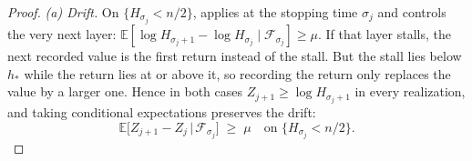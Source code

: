 \documentclass[
    aps,
    superscriptaddress,
    onecolumn,
    10pt,
    prx,
    nofootinbib
]{revtex4-2}
\theoremstyle{namedstatement}
\theoremstyle{plain}
\begin{document}
\begin{proof}
\smallskip\noindent\emph{(a) Drift.}
On $\{H_{\sigma_j}<n/2\}$,  applies at the stopping time $\sigma_j$ and controls the very next layer: $\mathbb E[\log H_{\sigma_j+1}-\log H_{\sigma_j}\mid\mathcal F_{\sigma_j}]\ge\mu$. If that layer stalls, the next recorded value is the first return instead of the stall. But the stall lies below $h_\ast$ while the return lies at or above it, so recording the return only replaces the value by a larger one. Hence in both cases $Z_{j+1}\ge\log H_{\sigma_j+1}$ in every realization, and taking conditional expectations preserves the drift: \begin{equation}\label{eq:embedded-drift}
  \mathbb E\big[Z_{j+1}-Z_j\,\big|\,\mathcal F_{\sigma_j}\big]\;\ge\;\mu
  \quad\text{on }\{H_{\sigma_j}<n/2\}.
\end{equation}


\end{proof}
\end{document}
